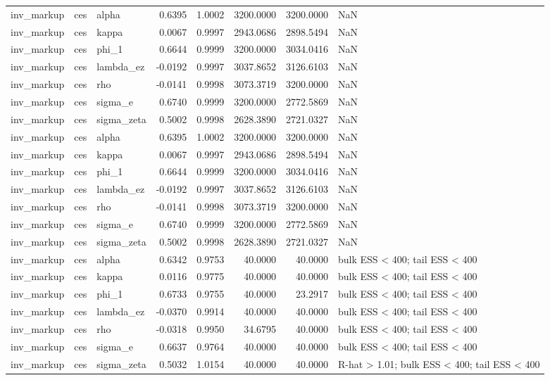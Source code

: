 \begin{tabular}{lllrrrrl}
inv\_markup & ces & alpha & 0.6395 & 1.0002 & 3200.0000 & 3200.0000 & NaN \\
inv\_markup & ces & kappa & 0.0067 & 0.9997 & 2943.0686 & 2898.5494 & NaN \\
inv\_markup & ces & phi\_1 & 0.6644 & 0.9999 & 3200.0000 & 3034.0416 & NaN \\
inv\_markup & ces & lambda\_ez & -0.0192 & 0.9997 & 3037.8652 & 3126.6103 & NaN \\
inv\_markup & ces & rho & -0.0141 & 0.9998 & 3073.3719 & 3200.0000 & NaN \\
inv\_markup & ces & sigma\_e & 0.6740 & 0.9999 & 3200.0000 & 2772.5869 & NaN \\
inv\_markup & ces & sigma\_zeta & 0.5002 & 0.9998 & 2628.3890 & 2721.0327 & NaN \\
inv\_markup & ces & alpha & 0.6395 & 1.0002 & 3200.0000 & 3200.0000 & NaN \\
inv\_markup & ces & kappa & 0.0067 & 0.9997 & 2943.0686 & 2898.5494 & NaN \\
inv\_markup & ces & phi\_1 & 0.6644 & 0.9999 & 3200.0000 & 3034.0416 & NaN \\
inv\_markup & ces & lambda\_ez & -0.0192 & 0.9997 & 3037.8652 & 3126.6103 & NaN \\
inv\_markup & ces & rho & -0.0141 & 0.9998 & 3073.3719 & 3200.0000 & NaN \\
inv\_markup & ces & sigma\_e & 0.6740 & 0.9999 & 3200.0000 & 2772.5869 & NaN \\
inv\_markup & ces & sigma\_zeta & 0.5002 & 0.9998 & 2628.3890 & 2721.0327 & NaN \\
inv\_markup & ces & alpha & 0.6342 & 0.9753 & 40.0000 & 40.0000 & bulk ESS < 400; tail ESS < 400 \\
inv\_markup & ces & kappa & 0.0116 & 0.9775 & 40.0000 & 40.0000 & bulk ESS < 400; tail ESS < 400 \\
inv\_markup & ces & phi\_1 & 0.6733 & 0.9755 & 40.0000 & 23.2917 & bulk ESS < 400; tail ESS < 400 \\
inv\_markup & ces & lambda\_ez & -0.0370 & 0.9914 & 40.0000 & 40.0000 & bulk ESS < 400; tail ESS < 400 \\
inv\_markup & ces & rho & -0.0318 & 0.9950 & 34.6795 & 40.0000 & bulk ESS < 400; tail ESS < 400 \\
inv\_markup & ces & sigma\_e & 0.6637 & 0.9764 & 40.0000 & 40.0000 & bulk ESS < 400; tail ESS < 400 \\
inv\_markup & ces & sigma\_zeta & 0.5032 & 1.0154 & 40.0000 & 40.0000 & R-hat > 1.01; bulk ESS < 400; tail ESS < 400 \\

\end{tabular}
